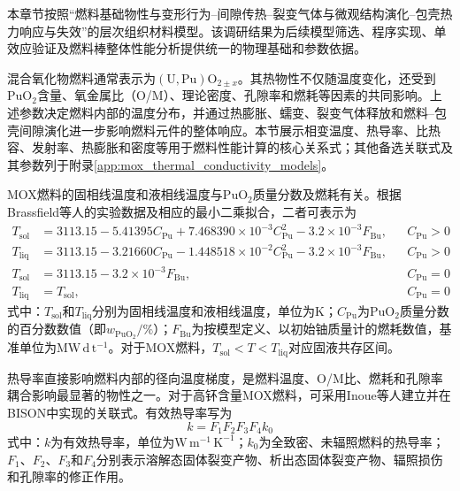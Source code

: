 本章节按照“燃料基础物性与变形行为--间隙传热--裂变气体与微观结构演化--包壳热力响应与失效”的层次组织材料模型。该调研结果为后续模型筛选、程序实现、单效应验证及燃料棒整体性能分析提供统一的物理基础和参数依据。

\label{sec:mox_thermophysical_properties}

混合氧化物燃料通常表示为$(\mathrm{U},\mathrm{Pu})\mathrm{O}_{2\pm x}$。其热物性不仅随温度变化，还受到$\mathrm{PuO}_2$含量、氧金属比（O/M）、理论密度、孔隙率和燃耗等因素的共同影响。上述参数决定燃料内部的温度分布，并通过热膨胀、蠕变、裂变气体释放和燃料--包壳间隙演化进一步影响燃料元件的整体响应。本节展示相变温度、热导率、比热容、发射率、热膨胀和密度等用于燃料性能计算的核心关系式；其他备选关联式及其参数列于附录\ref{app:mox_thermal_conductivity_models}。


MOX燃料的固相线温度和液相线温度与$\mathrm{PuO}_2$质量分数及燃耗有关。根据Brassfield等人的实验数据及相应的最小二乘拟合，二者可表示为
\begin{subequations}\label{eq:mox_phase_transition_temperature}
	\begin{align}
		T_{\mathrm{sol}}
		&=3113.15-5.41395C_{\mathrm{Pu}}
		+7.468390\times10^{-3}C_{\mathrm{Pu}}^{2}
		-3.2\times10^{-3}F_{\mathrm{Bu}},
		&& C_{\mathrm{Pu}}>0\label{eq:mox_solidus_with_pu}\\
		T_{\mathrm{liq}}
		&=3113.15-3.21660C_{\mathrm{Pu}}
		-1.448518\times10^{-2}C_{\mathrm{Pu}}^{2}
		-3.2\times10^{-3}F_{\mathrm{Bu}},
		&& C_{\mathrm{Pu}}>0\label{eq:mox_liquidus_with_pu}\\
		T_{\mathrm{sol}}
		&=3113.15-3.2\times10^{-3}F_{\mathrm{Bu}},
		&& C_{\mathrm{Pu}}=0\label{eq:uo2_solidus}\\
		T_{\mathrm{liq}}&=T_{\mathrm{sol}},
		&& C_{\mathrm{Pu}}=0\label{eq:uo2_liquidus}
	\end{align}
\end{subequations}
式中：$T_{\mathrm{sol}}$和$T_{\mathrm{liq}}$分别为固相线温度和液相线温度，单位为$\mathrm{K}$；$C_{\mathrm{Pu}}$为$\mathrm{PuO}_2$质量分数的百分数数值（即$w_{\mathrm{PuO}_2}/\%$）；$F_{\mathrm{Bu}}$为按模型定义、以初始铀质量计的燃耗数值，基准单位为$\mathrm{MW\,d\,t^{-1}}$。对于MOX燃料，$T_{\mathrm{sol}}<T<T_{\mathrm{liq}}$对应固液共存区间。


热导率直接影响燃料内部的径向温度梯度，是燃料温度、O/M比、燃耗和孔隙率耦合影响最显著的物性之一。对于高钚含量MOX燃料，可采用Inoue等人建立并在BISON中实现的关联式\cite{inoueThermalConductivityUranium2000,halesBISONTheoryManual2016}。有效热导率写为
\begin{equation}
	k=F_1F_2F_3F_4k_0
	\label{eq:fast_mox_thermal_conductivity}
\end{equation}
式中：$k$为有效热导率，单位为$\mathrm{W\,m^{-1}\,K^{-1}}$；$k_0$为全致密、未辐照燃料的热导率；$F_1$、$F_2$、$F_3$和$F_4$分别表示溶解态固体裂变产物、析出态固体裂变产物、辐照损伤和孔隙率的修正作用。

